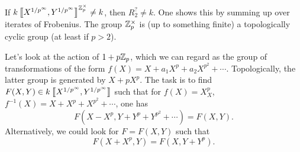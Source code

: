 If $k\left\llbracket {X^{1/p^\infty},Y^{1/p^\infty}} \right\rrbracket^{\mathbb{Z}_p^\times}\ne k$, then 
$R_2^?\ne k$. One shows this by summing up over iterates of Frobenius. 
The group $\mathbb{Z}_p^\times$ is (up to something finite) a topologically cyclic 
group (at least if $p>2$). 

Let's look at the action of $1+p\mathbb{Z}_p$, which we can regard as the group of 
transformations of the form $f(X)=X+a_1 X^p + a_2 X^{p^2} + \cdots$. Topologically, the latter group is generated by $X + p X^p$. The task 
is to find $F(X,Y)\in k\left\llbracket {X^{1/p^\infty},Y^{1/p^\infty}} \right\rrbracket$ such that for 
$f(X)=X_X^p$, $f^{-1}(X)=X+X^p+X^{p^2} + \cdots$, one has 
\[
  F(X-X^p,Y+Y^p+Y^{p^2}+\cdots ) = F(X,Y) .
\]
Alternatively, we could look for $F=F(X,Y)$ such that 
\[
  F(X+X^p,Y) = F(X,Y+Y^p) .
\]




